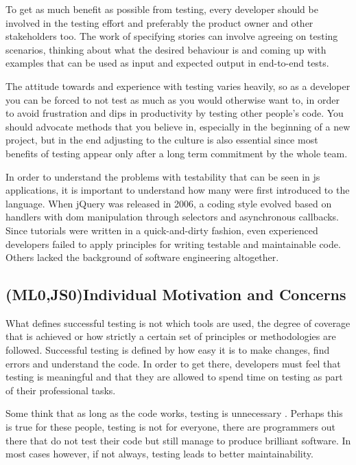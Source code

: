 \documentclass[11pt]{article}
\begin{document}
To get as much benefit as possible from testing, every developer should be involved in the testing effort and preferably the product owner and other stakeholders too. The work of specifying stories can involve agreeing on testing scenarios, thinking about what the desired behaviour is and coming up with examples that can be used as input and expected output in end-to-end tests. \cite[questions~39-40]{Edelstam}\cite[question~30]{Stenmark}

The attitude towards and experience with testing varies heavily, so as a developer you can be forced to not test as much as you would otherwise want to, in order to avoid frustration and dips in productivity by testing other people's code. You should advocate methods that you believe in, especially in the beginning of a new project, but in the end adjusting to the culture is also essential since most benefits of testing appear only after a long term commitment by the whole team. \cite[questions~31-32]{Stenmark}

In order to understand the problems with testability that can be seen in \gls{js} applications, it is important to understand how many were first introduced to the language. When jQuery was released in 2006, a coding style evolved based on handlers with \gls{dom} manipulation through selectors and asynchronous callbacks. Since tutorials were written in a quick-and-dirty fashion, even experienced developers failed to apply principles for writing testable and maintainable code. Others lacked the background of software engineering altogether. \cite[question~10]{Stenmark}


\subsection{(ML0,JS0)Individual Motivation and Concerns}
\label{subsec:motivationconcerns}

What defines successful testing is not which tools are used, the degree of coverage that is achieved or how strictly a certain set of principles or methodologies are followed. Successful testing is defined by how easy it is to make changes, find errors and understand the code. In order to get there, developers must feel that testing is meaningful and that they are allowed to spend time on testing as part of their professional tasks.

Some think that as long as the code works, testing is unnecessary \cite[question~13]{Ahnve}. Perhaps this is true for these people, testing is not for everyone, there are programmers out there that do not test their code but still manage to produce brilliant software. In most cases however, if not always, testing leads to better maintainability. \cite[question~33]{Ahnve}
\end{document}

